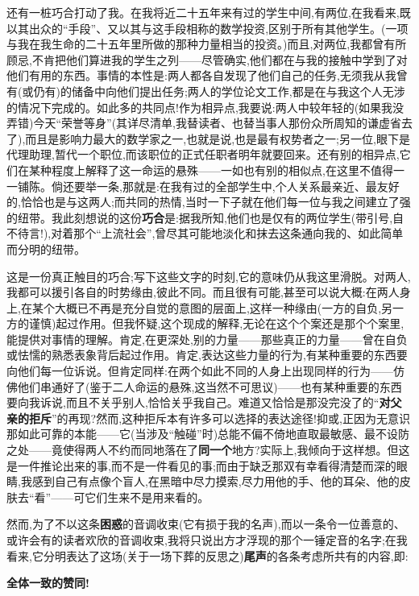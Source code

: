 还有一桩巧合打动了我。在我将近二十五年来有过的学生中间,有两位,在我看来,既以其出众的“手段”、又以其与这手段相称的数学投资,区别于所有其他学生。(一项与我在我生命的二十五年里所做的那种力量相当的投资。)而且,对两位,我都曾有所顾忌,不肯把他们算进我的学生之列——尽管确实,他们都在与我的接触中学到了对他们有用的东西。事情的本性是:两人都各自发现了他们自己的任务,无须我从我曾有(或仍有)的储备中向他们提出任务;两人的学位论文工作,都是在与我这个人无涉的情况下完成的。如此多的共同点\dmark{}!作为相异点,我要说:两人中较年轻的(如果我没弄错)今天“荣誉等身”(其详尽清单,我替读者、也替当事人那份众所周知的谦虚省去了),而且是影响力最大的数学家之一,也就是说,也是最有权势者之一;另一位,眼下是代理助理,暂代一个职位,而该职位的正式任职者明年就要回来。还有别的相异点,它们在某种程度上解释了这一命运的悬殊——一如也有别的相似点,在这里不值得一一铺陈。倘还要举一条,那就是:在我有过的全部学生中,个人关系最亲近、最友好的,恰恰也是与这两人;而共同的热情,当时一下子就在他们每一位与我之间建立了强的纽带。我此刻想说的这份\textbf{巧合}是:据我所知,他们也是仅有的两位学生(带引号,自不待言!),对着那个“上流社会”,曾尽其可能地淡化和抹去这条通向我的、如此简单而分明的纽带。

这是一份真正触目的巧合;写下这些文字的时刻,它的意味仍从我这里滑脱。对两人,我都可以援引各自的时势缘由,彼此不同。而且很有可能,甚至可以说大概:在两人身上,在某个大概已不再是充分自觉的意图的层面上,这样一种缘由(一方的自负,另一方的谨慎)起过作用。但我怀疑,这个现成的解释,无论在这个个案还是那个个案里,能提供对事情的理解。肯定,在更深处,别的力量——那些真正的力量——曾在自负或怯懦的熟悉表象背后起过作用。肯定,表达这些力量的行为,有某种重要的东西要向他们每一位诉说。但肯定同样:在两个如此不同的人身上出现同样的行为——仿佛他们串通好了(鉴于二人命运的悬殊,这当然不可思议)——也有某种重要的东西要向我诉说,而且不关乎别人,恰恰关乎我自己。难道又恰恰是那没完没了的“\textbf{对父亲的拒斥}”的再现?然而,这种拒斥\dmark{}本有许多可以选择的表达途径!抑或,正因为无意识那如此可靠的本能——它(当涉及“触碰”时)总能不偏不倚地直取最敏感、最不设防之处——竟使得两人不约而同地落在了\textbf{同一个}地方?实际上,我倾向于这样想。但这是一件推论出来的事,而不是一件看见的事;而由于缺乏那双有幸看得清楚而深的眼睛,我感到自己有点像个盲人,在黑暗中尽力摸索,尽力用他的手、他的耳朵、他的皮肤去“看”——可它们生来不是用来看的。

然而,为了不以这条\textbf{困惑}的音调收束(它有损于我的名声),而以一条令一位善意的、或许会有的读者欢欣的音调收束,我将只说出方才浮现的那个一锤定音的名字;在我看来,它分明表达了这场(关于一场下葬的反思之)\textbf{尾声}的各条考虑所共有的内容,即:

\begin{center}\textbf{全体一致的赞同!}\end{center}
